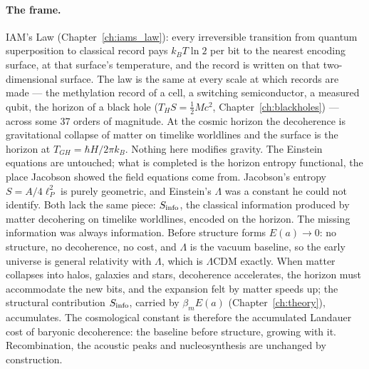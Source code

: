 \paragraph{The frame.} IAM's Law (Chapter~\ref{ch:iams_law}): every irreversible transition from quantum superposition to classical record pays $k_BT\ln2$ per bit
to the nearest encoding surface, at that surface's temperature, and the record is written on that two-dimensional surface. The law is the same at
every scale at which records are made --- the methylation record of a cell, a switching semiconductor, a measured qubit, the horizon of a black hole
($T_HS=\tfrac12Mc^2$, Chapter~\ref{ch:blackholes}) --- across some 37 orders of magnitude. At the cosmic horizon the decoherence is gravitational collapse of matter on timelike worldlines
and the surface is the horizon at $T_{GH}=\hbar H/2\pi k_B$. Nothing here modifies gravity. The Einstein equations are untouched; what is completed is the horizon entropy functional,
the place Jacobson showed the field equations come from. Jacobson's entropy $S=A/4\ell_P^2$ is purely geometric, and Einstein's $\Lambda$ was a
constant he could not identify. Both lack the same piece: $S_{\rm info}$, the classical information produced by matter decohering on timelike
worldlines, encoded on the horizon. The missing information was always information. Before structure forms $E(a)\to0$: no structure, no decoherence, no cost,
and $\Lambda$ is the vacuum baseline, so the early universe is general relativity with $\Lambda$, which is $\Lambda$CDM exactly. When matter
collapses into halos, galaxies and stars, decoherence accelerates, the horizon must accommodate the new bits, and the expansion felt by matter
speeds up; the structural contribution $S_{\rm info}$, carried by $\beta_mE(a)$ (Chapter~\ref{ch:theory}), accumulates. The cosmological
constant is therefore the accumulated Landauer cost of baryonic decoherence: the baseline before structure, growing with it. Recombination, the acoustic peaks and nucleosynthesis are unchanged by construction.

